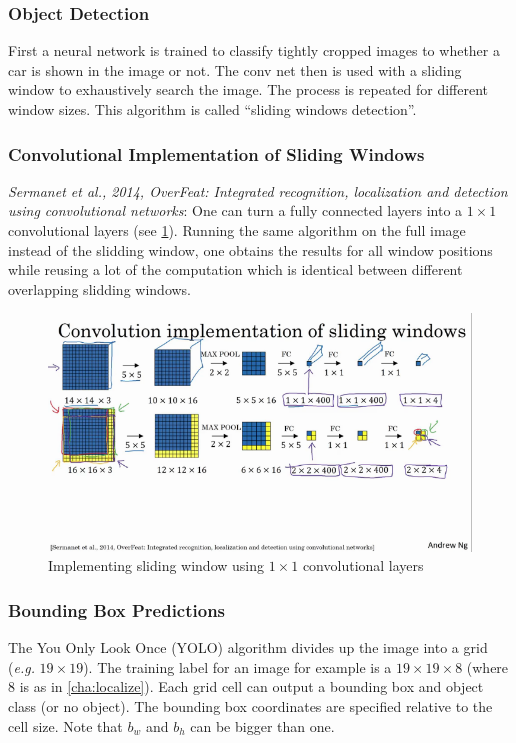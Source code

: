 \documentclass{article}
\begin{document}
\subsubsection{Object Detection}
First a neural network is trained to classify tightly cropped images to whether a car is shown in the image or not.
The conv net then is used with a sliding window to exhaustively search the image.
The process is repeated for different window sizes.
This algorithm is called ``sliding windows detection''.

\subsubsection{Convolutional Implementation of Sliding Windows}\label{cha:cnnslide}
\emph{Sermanet et al., 2014, OverFeat: Integrated recognition, localization and detection using convolutional networks}:
One can turn a fully connected layers into a $1\times 1$ convolutional layers (see \cref{fig:convslide}).
Running the same algorithm on the full image instead of the slidding window, one obtains the results for all window positions
while reusing a lot of the computation which is identical between different overlapping slidding windows.
\begin{figure}[htbp]
  \begin{center}
    \includegraphics[width=\textwidth]{convslide}
    \caption{Implementing sliding window using $1\times 1$ convolutional layers}
    \label{fig:convslide}
  \end{center}
\end{figure}

\subsubsection{Bounding Box Predictions}\label{cha:bbpred}
The You Only Look Once (YOLO) algorithm divides up the image into a grid (\emph{e.g.} $19\times 19$).
The training label for an image for example is a $19\times 19\times 8$ (where $8$ is as in \cref{cha:localize}).
Each grid cell can output a bounding box and object class (or no object).
The bounding box coordinates are specified relative to the cell size.
Note that $b_w$ and $b_h$ can be bigger than one.
\end{document}
